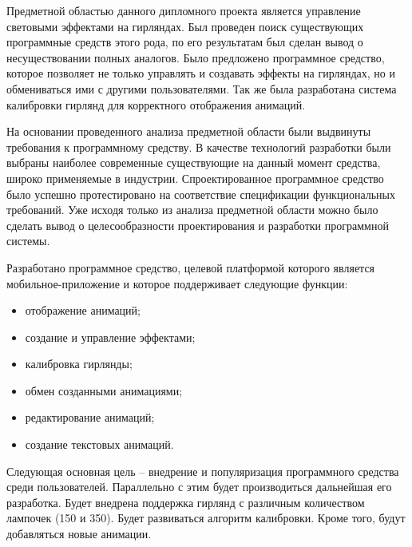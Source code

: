 Предметной областью данного дипломного проекта является управление световыми эффектами на гирляндах. Был проведен поиск существующих программные средств этого рода, по его результатам был сделан вывод о несуществовании полных аналогов. Было предложено программное средство, которое позволяет не только управлять и создавать эффекты на гирляндах, но и обмениваться ими с другими пользователями. Так же была разработана система калибровки гирлянд для корректного отображения анимаций. 

На основании проведенного анализа предметной области были выдвинуты требования к программному средству. В качестве технологий разработки были выбраны наиболее современные существующие на данный момент средства, широко применяемые в индустрии. Спроектированное программное средство было успешно протестировано на соответствие спецификации функциональных требований. Уже исходя только из анализа предметной области можно было сделать вывод о целесообразности проектирования и разработки программной системы.

Разработано программное средство, целевой платформой которого является мобильное-приложение и которое поддерживает следующие функции:
\begin{itemize}
	\item отображение анимаций;
	\item создание и управление эффектами;
	\item калибровка гирлянды;
	\item обмен созданными анимациями;
	\item редактирование анимаций;
	\item создание текстовых анимаций.
\end{itemize}

Следующая основная цель -- внедрение и популяризация программного средства среди пользователей. Параллельно с этим будет производиться дальнейшая его разработка. Будет внедрена поддержка гирлянд с различным количеством лампочек (150 и 350). Будет развиваться алгоритм калибровки. Кроме того, будут добавляться новые анимации.
